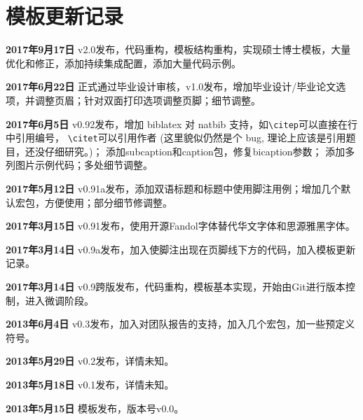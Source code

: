 \chapter{模板更新记录}
\label{chap:updatelog}

\textbf{2017年9月17日} v2.0发布，代码重构，模板结构重构，实现硕士博士模板，大量优化和修正，添加持续集成配置，添加大量代码示例。

\textbf{2017年6月22日} \nuaathesis 正式通过毕业设计审核，v1.0发布，增加毕业设计/毕业论文选项，并调整页眉；针对双面打印选项调整页脚；细节调整。

\textbf{2017年6月5日} v0.92发布，增加 biblatex 对 natbib 支持，如\verb!\citep!可以直接在行中引用编号， \verb!\citet!可以引用作者 (这里貌似仍然是个 bug, 理论上应该是引用题目，还没仔细研究。)； 添加subcaption和caption包，修复bicaption参数； 添加多列图片示例代码；多处细节调整。

\textbf{2017年5月12日} v0.91a发布，添加双语标题和标题中使用脚注用例；增加几个默认宏包，方便使用；部分细节修调整。

\textbf{2017年3月15日} v0.91发布，使用开源Fandol字体替代华文字体和思源雅黑字体。

\textbf{2017年3月14日} v0.9a发布，加入使脚注出现在页脚线下方的代码，加入模板更新记录。

\textbf{2017年3月14日} v0.9跨版发布，代码重构，模板基本实现，开始由Git进行版本控制，进入微调阶段。

\textbf{2013年6月4日} v0.3发布，加入对团队报告的支持，加入几个宏包，加一些预定义符号。

\textbf{2013年5月29日} v0.2发布，详情未知。

\textbf{2013年5月18日} v0.1发布，详情未知。

\textbf{2013年5月15日} 模板发布，版本号v0.0。
